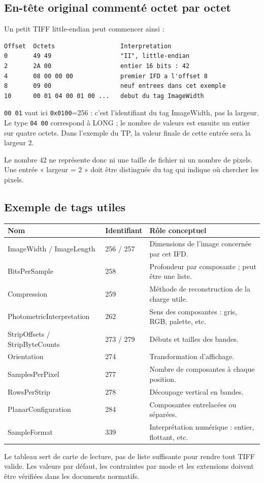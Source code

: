 \subsection{En-tête original commenté octet par octet}
Un petit TIFF little-endian peut commencer ainsi :
\begin{verbatim}
Offset  Octets                  Interpretation
0       49 49                   "II", little-endian
2       2A 00                   entier 16 bits : 42
4       08 00 00 00             premier IFD a l'offset 8
8       09 00                   neuf entrees dans cet exemple
10      00 01 04 00 01 00 ...   debut du tag ImageWidth
\end{verbatim}
\texttt{00 01} vaut ici \texttt{0x0100}=256 : c'est
l'identifiant du tag ImageWidth, pas la largeur. Le type
\texttt{04 00} correspond à LONG ; le nombre de valeurs est
ensuite un entier sur quatre octets. Dans l'exemple du TP,
la valeur finale de cette entrée sera la largeur 2.

Le nombre 42 ne représente donc ni une taille de fichier ni
un nombre de pixels. Une entrée « largeur = 2 » doit être
distinguée du tag qui indique où chercher les pixels.

\subsection{Exemple de tags utiles}
\begin{longtable}{p{4.3cm}p{2cm}p{8.2cm}}
\toprule Nom & Identifiant & Rôle conceptuel \\ \midrule
ImageWidth / ImageLength & 256 / 257 & Dimensions de l'image concernée par cet IFD. \\
BitsPerSample & 258 & Profondeur par composante ; peut être une liste. \\
Compression & 259 & Méthode de reconstruction de la charge utile. \\
Photometric\-Interpretation & 262 & Sens des composantes : gris, RGB, palette, etc. \\
StripOffsets / StripByteCounts & 273 / 279 & Débuts et tailles des bandes. \\
Orientation & 274 & Transformation d'affichage. \\
SamplesPerPixel & 277 & Nombre de composantes à chaque position. \\
RowsPerStrip & 278 & Découpage vertical en bandes. \\
PlanarConfiguration & 284 & Composantes entrelacées ou séparées. \\
SampleFormat & 339 & Interprétation numérique : entier, flottant, etc. \\
\bottomrule
\end{longtable}
Le tableau sert de carte de lecture, pas de liste suffisante
pour rendre tout TIFF valide. Les valeurs par défaut, les
contraintes par mode et les extensions doivent être vérifiées
dans les documents normatifs.

